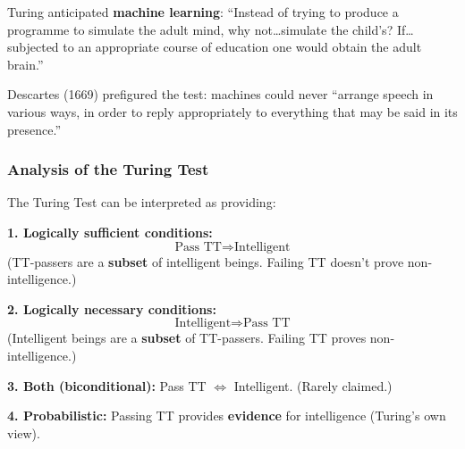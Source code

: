 \begin{tipbox}
Turing anticipated \textbf{machine learning}: ``Instead of trying to produce a programme to simulate the adult mind, why not\ldots simulate the child's? If\ldots subjected to an appropriate course of education one would obtain the adult brain.''

Descartes (1669) prefigured the test: machines could never ``arrange speech in various ways, in order to reply appropriately to everything that may be said in its presence.''
\end{tipbox}

\bigseparator

\subsubsection{Analysis of the Turing Test}

\begin{defbox}
The Turing Test can be interpreted as providing:

\textbf{1. Logically sufficient conditions:}
\[
\text{Pass TT} \Rightarrow \text{Intelligent}
\]
(TT-passers are a \textbf{subset} of intelligent beings. Failing TT doesn't prove non-intelligence.)

\textbf{2. Logically necessary conditions:}
\[
\text{Intelligent} \Rightarrow \text{Pass TT}
\]
(Intelligent beings are a \textbf{subset} of TT-passers. Failing TT proves non-intelligence.)

\textbf{3. Both (biconditional):} Pass TT $\Leftrightarrow$ Intelligent. (Rarely claimed.)

\textbf{4. Probabilistic:} Passing TT provides \textbf{evidence} for intelligence (Turing's own view).
\end{defbox}

